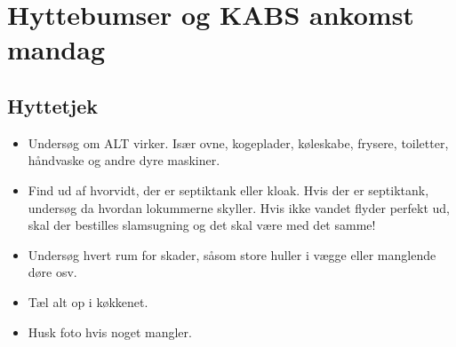 \section{Hyttebumser og KABS ankomst mandag}

\subsection*{Hyttetjek}
\begin{itemize}
\item Undersøg om ALT virker. Især ovne, kogeplader, køleskabe, frysere, toiletter, håndvaske og andre dyre maskiner.
\item Find ud af hvorvidt, der er septiktank eller kloak. Hvis der er septiktank, undersøg da hvordan lokummerne skyller. Hvis ikke vandet flyder perfekt ud, skal der bestilles slamsugning og det skal være med det samme!
\item Undersøg hvert rum for skader, såsom store huller i vægge eller manglende døre osv.
\item Tæl alt op i køkkenet. 
\item Husk foto hvis noget mangler.
\end{itemize}

